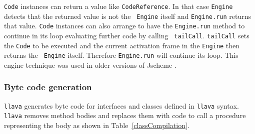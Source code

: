 \documentclass{acm-final/sig-alternate-modified}
\begin{document}
{\tt Code} instances can return a value like {\tt CodeReference}.  In
that case {\tt Engine} detects that the returned value is not the {\tt
Engine} itself and {\tt Engine.run} returns that value.  {\tt Code}
instances can also arrange to have the {\tt Engine.run} method to
continue in its loop evaluating further code by calling {\tt
tailCall}.  {\tt tailCall} sets the {\tt Code} to be executed and the
current activation frame in the {\tt Engine} then returns the {\tt
Engine} itself.  Therefore {\tt Engine.run} will continue its loop.
This engine technique was used in older versions of Jscheme
\cite{JschemeEngine}.

\subsubsection{Byte code generation}

{\tt llava} generates byte code for interfaces and classes defined in
{\tt llava} syntax.  {\tt llava} removes method bodies and replaces
them with code to call a procedure representing the body as shown in
Table~\ref{classCompilation}.
\end{document}
